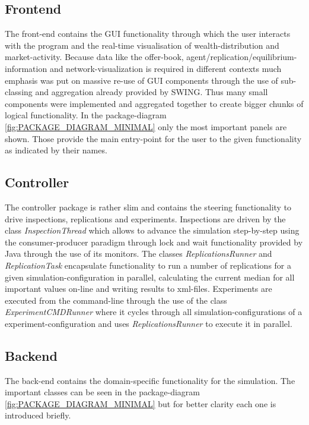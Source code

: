 \documentclass[Bachelorarbeit.tex]{subfiles}
\begin{document}
\subsection{Frontend}
The front-end contains the GUI functionality through which the user interacts with the program and the real-time visualisation of wealth-distribution and market-activity. Because data like the offer-book, agent/replication/equilibrium-information and network-visualization is required in different contexts much emphasis was put on massive re-use of GUI components through the use of sub-classing and aggregation already provided by SWING. Thus many small components were implemented and aggregated together to create bigger chunks of logical functionality. In the package-diagram \ref{fig:PACKAGE_DIAGRAM_MINIMAL} only the most important panels are shown. Those provide the main entry-point for the user to the given functionality as indicated by their names.

\subsection{Controller}
The controller package is rather slim and contains the steering functionality to drive inspections, replications and experiments. Inspections are driven by the class \textit{InspectionThread} which allows to advance the simulation step-by-step using the consumer-producer paradigm through lock and wait functionality provided by Java through the use of its monitors. The classes \textit{ReplicationsRunner} and \textit{ReplicationTask} encapsulate functionality to run a number of replications for a given simulation-configuration in parallel, calculating the current median for all important values on-line and writing results to xml-files. Experiments are executed from the command-line through the use of the class \textit{ExperimentCMDRunner} where it cycles through all simulation-configurations of a experiment-configuration and uses \textit{ReplicationsRunner} to execute it in parallel. 

\subsection{Backend}
The back-end contains the domain-specific functionality for the simulation. The important classes can be seen in the package-diagram \ref{fig:PACKAGE_DIAGRAM_MINIMAL} but for better clarity each one is introduced briefly.
\end{document}

